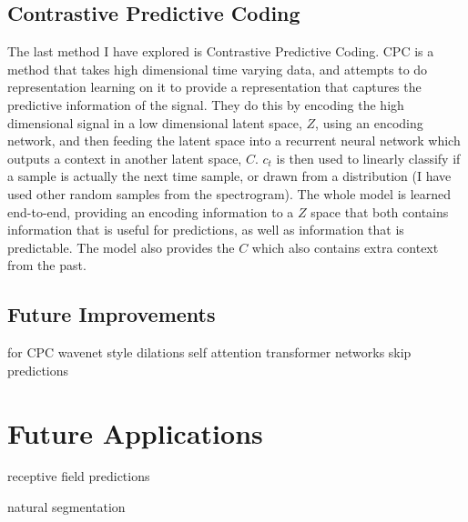 \subsection{Contrastive Predictive Coding}
The last method I have explored is Contrastive Predictive Coding\cite{CPC}. CPC is a method that takes high dimensional time varying data, and attempts to do representation learning on it to provide a representation that captures the predictive information of the signal. They do this by encoding the high dimensional signal in a low dimensional latent space, $Z$, using an encoding network, and then feeding the latent space into a recurrent neural network which outputs a context in another latent space, $C$. $c_t$ is then used to linearly classify if a sample is actually the next time sample, or drawn from a distribution (I have used other random samples from the spectrogram). The whole model is learned end-to-end, providing an encoding information to a $Z$ space that both contains information that is useful for predictions, as well as information that is predictable. The model also provides the $C$ which also contains extra context from the past.

\subsection{Future Improvements}
 for CPC
wavenet style dilations
self attention
transformer networks
skip predictions

\section{Future Applications}

receptive field predictions

natural segmentation
